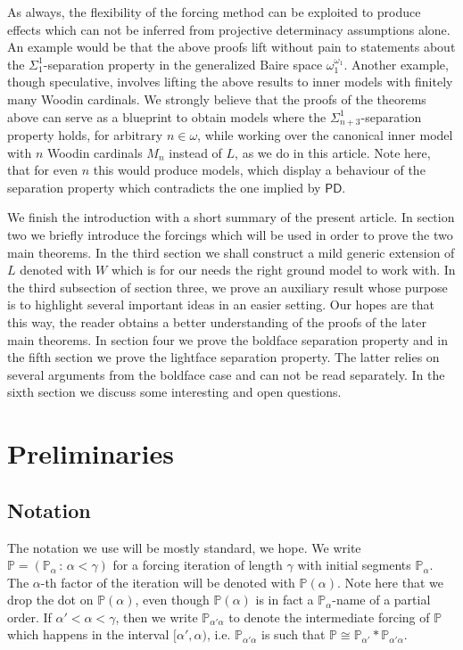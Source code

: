 \documentclass[a4paper,11pt]{article}
\newcommand{\forceP}{\mathbb{P}}
\newcommand{\PD}{\mathsf{PD}}
\begin{document}
As always, the flexibility of the forcing method can be exploited to produce effects which can not be inferred from projective determinacy assumptions alone. An example would be that the above proofs lift without pain to statements about the $\Sigma^1_1$-separation property in the generalized Baire space $\omega_1^{\omega_1}$. Another example, though speculative, involves lifting the above results to inner models with finitely many Woodin cardinals. We strongly believe that the proofs of the theorems above can serve as a blueprint to obtain models where the $\Sigma^1_{n+3}$-separation property holds, for arbitrary $n \in \omega$, while working over the canonical inner model with $n$ Woodin cardinals $M_n$ instead of $L$, as we do in this article. Note here, that for even $n$ this would produce models, which display a behaviour of the separation property which contradicts the one implied by $\PD$.

We finish the introduction with a short summary of the present article. In section two we briefly introduce the forcings which will be used in order to prove the two main theorems. In the third section we shall construct a mild generic extension of $L$ denoted with $W$ which is for our needs the right ground model to work with. In the third subsection of section three, we prove an auxiliary result whose purpose is to highlight several important ideas in an easier setting. Our hopes are that this way, the reader obtains a better understanding of the proofs of the later main theorems.
In section four we prove the boldface separation property and in the fifth section we prove the lightface separation property. The latter relies on several arguments from the boldface case and can not be read separately. In the sixth section we discuss some interesting and open questions.


\section{Preliminaries}

\subsection{Notation}
The notation we use will be mostly standard, we hope. We write $\forceP=(\forceP_{\alpha} \, : \, \alpha < \gamma)$ for a forcing iteration of length $\gamma$ with initial segments $\forceP_{\alpha}$. The $\alpha$-th factor of the iteration will be denoted with $\forceP(\alpha)$. Note here that we drop the dot on $\forceP(\alpha)$, even though $\forceP(\alpha)$ is in fact a $\forceP_{\alpha}$-name of a partial order. 
If $\alpha' < \alpha < \gamma$, then we write $\forceP_{\alpha' \alpha}$ to denote the intermediate forcing of $\forceP$ which happens in the interval $[\alpha',\alpha)$, i.e. $\forceP_{\alpha' \alpha}$ is such that 
$\forceP \cong \forceP_{\alpha'} \ast \forceP_{\alpha' \alpha}$.
\end{document}
